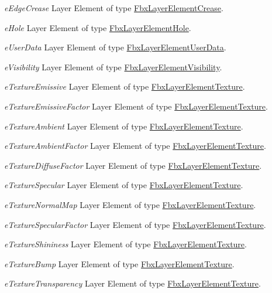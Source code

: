 \begin{DoxyItemize}
\item {\itshape e\+Edge\+Crease} Layer Element of type \hyperlink{class_fbx_layer_element_crease}{Fbx\+Layer\+Element\+Crease}.
\item {\itshape e\+Hole} Layer Element of type \hyperlink{class_fbx_layer_element_hole}{Fbx\+Layer\+Element\+Hole}.
\item {\itshape e\+User\+Data} Layer Element of type \hyperlink{class_fbx_layer_element_user_data}{Fbx\+Layer\+Element\+User\+Data}.
\item {\itshape e\+Visibility} Layer Element of type \hyperlink{class_fbx_layer_element_visibility}{Fbx\+Layer\+Element\+Visibility}.
\item {\itshape e\+Texture\+Emissive} Layer Element of type \hyperlink{class_fbx_layer_element_texture}{Fbx\+Layer\+Element\+Texture}.
\item {\itshape e\+Texture\+Emissive\+Factor} Layer Element of type \hyperlink{class_fbx_layer_element_texture}{Fbx\+Layer\+Element\+Texture}.
\item {\itshape e\+Texture\+Ambient} Layer Element of type \hyperlink{class_fbx_layer_element_texture}{Fbx\+Layer\+Element\+Texture}.
\item {\itshape e\+Texture\+Ambient\+Factor} Layer Element of type \hyperlink{class_fbx_layer_element_texture}{Fbx\+Layer\+Element\+Texture}.
\item {\itshape e\+Texture\+Diffuse\+Factor} Layer Element of type \hyperlink{class_fbx_layer_element_texture}{Fbx\+Layer\+Element\+Texture}.
\item {\itshape e\+Texture\+Specular} Layer Element of type \hyperlink{class_fbx_layer_element_texture}{Fbx\+Layer\+Element\+Texture}.
\item {\itshape e\+Texture\+Normal\+Map} Layer Element of type \hyperlink{class_fbx_layer_element_texture}{Fbx\+Layer\+Element\+Texture}.
\item {\itshape e\+Texture\+Specular\+Factor} Layer Element of type \hyperlink{class_fbx_layer_element_texture}{Fbx\+Layer\+Element\+Texture}.
\item {\itshape e\+Texture\+Shininess} Layer Element of type \hyperlink{class_fbx_layer_element_texture}{Fbx\+Layer\+Element\+Texture}.
\item {\itshape e\+Texture\+Bump} Layer Element of type \hyperlink{class_fbx_layer_element_texture}{Fbx\+Layer\+Element\+Texture}.
\item {\itshape e\+Texture\+Transparency} Layer Element of type \hyperlink{class_fbx_layer_element_texture}{Fbx\+Layer\+Element\+Texture}.

\end{DoxyItemize}
